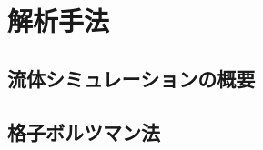 \documentclass[main]{subfiles}
\begin{document}
\chapter{解析手法}

\section{流体シミュレーションの概要}


\section{格子ボルツマン法}

\end{document}
